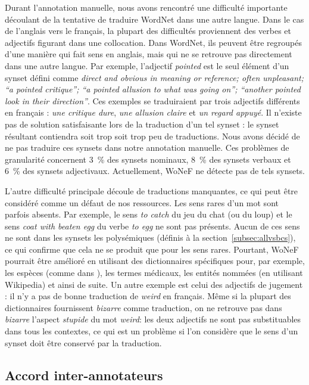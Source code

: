 Durant l'annotation manuelle, nous avons rencontré une difficulté importante découlant de la tentative de traduire WordNet dans une autre langue. Dans le cas de l'anglais vers le français, la plupart des difficultés proviennent des verbes et adjectifs figurant dans une collocation. Dans WordNet, ils peuvent être regroupés d'une manière qui fait sens en anglais, mais qui ne se retrouve pas directement dans une autre langue. Par exemple, l'adjectif \textit{pointed} est le seul élément d'un synset défini comme \textit{direct and obvious in meaning or reference; often unpleasant; ``a pointed critique''; ``a pointed allusion to what was going on''; ``another pointed look in their direction''}. Ces exemples se traduiraient par trois adjectifs différents en français : \textit{une critique dure}, \textit{une allusion claire} et \textit{un regard appuyé}. Il n'existe pas de solution satisfaisante lors de la traduction d'un tel synset : le synset résultant contiendra soit trop soit trop peu de traductions. Nous avons décidé de ne pas traduire ces synsets dans notre annotation manuelle. Ces problèmes de granularité concernent 3~\% des synsets nominaux, 8~\% des synsets verbaux et 6~\% des synsets adjectivaux. Actuellement, WoNeF ne détecte pas de tels synsets.

L'autre difficulté principale découle de traductions manquantes, ce qui peut être considéré comme un défaut de nos ressources. Les sens rares d'un mot sont parfois absents. Par exemple, le sens \textit{to catch} du jeu du chat (ou du loup) et le sens \textit{coat with beaten egg} du verbe \textit{to egg} ne sont pas présents. Aucun de ces sens ne sont dans les synsets les polysémiques (définis à la section~\ref{subsec:allvsbcs}), ce qui confirme que cela ne se produit que pour les sens rares. Pourtant, WoNeF pourrait être amélioré en utilisant des dictionnaires spécifiques pour, par exemple, les espèces (comme dans \cite{sagot2008construction}), les termes médicaux, les entités nommées (en utilisant Wikipedia) et ainsi de suite. Un autre exemple est celui des adjectifs de jugement : il n'y a pas de bonne traduction de \textit{weird} en français. Même si la plupart des dictionnaires fournissent \textit{bizarre} comme traduction, on ne retrouve pas dans \textit{bizarre} l'aspect \textit{stupide} du mot \textit{weird}: les deux adjectifs ne sont pas substituables dans tous les contextes, ce qui est un problème si l'on considère que le sens d'un synset doit être conservé par la traduction.

\subsection{Accord inter-annotateurs}
\label{subsec:interannotator_agreement}

